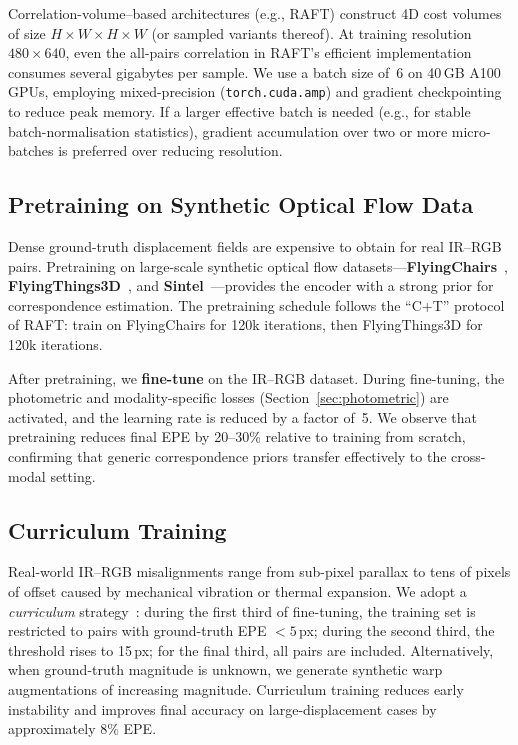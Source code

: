 Correlation-volume--based architectures (e.g., RAFT) construct 4D cost
volumes of size $H \times W \times H \times W$ (or sampled variants thereof).
At training resolution $480\times640$, even the all-pairs correlation in
RAFT's efficient implementation consumes several gigabytes per sample.  We
use a batch size of~6 on 40\,GB A100 GPUs, employing mixed-precision
(\texttt{torch.cuda.amp}) and gradient checkpointing to reduce peak memory.
If a larger effective batch is needed (e.g., for stable batch-normalisation
statistics), gradient accumulation over two or more micro-batches is
preferred over reducing resolution.

\subsection{Pretraining on Synthetic Optical Flow Data}
\label{ssec:pretrain}

Dense ground-truth displacement fields are expensive to obtain for real
IR--RGB pairs.  Pretraining on large-scale synthetic optical flow
datasets---\textbf{FlyingChairs}~\cite{dosovitskiy2015flownet},
\textbf{FlyingThings3D}~\cite{mayer2016things3d}, and
\textbf{Sintel}~\cite{butler2012sintel}---provides the encoder with a strong
prior for correspondence estimation.  The pretraining schedule
follows the ``C+T'' protocol of RAFT: train on FlyingChairs for 120k
iterations, then FlyingThings3D for 120k iterations.

After pretraining, we \textbf{fine-tune} on the IR--RGB dataset.  During
fine-tuning, the photometric and modality-specific losses
(Section~\ref{sec:photometric}) are activated, and the learning rate is
reduced by a factor of~5.  We observe that pretraining reduces final EPE by
20--30\% relative to training from scratch, confirming that generic
correspondence priors transfer effectively to the cross-modal setting.

\subsection{Curriculum Training}
\label{ssec:curriculum}

Real-world IR--RGB misalignments range from sub-pixel parallax to tens of
pixels of offset caused by mechanical vibration or thermal expansion.  We
adopt a \emph{curriculum} strategy~\cite{bengio2009curriculum}: during the
first third of fine-tuning, the training set is restricted to pairs with
ground-truth EPE $< 5$\,px; during the second third, the threshold rises to
15\,px; for the final third, all pairs are included.  Alternatively, when
ground-truth magnitude is unknown, we generate synthetic warp augmentations of
increasing magnitude.  Curriculum training reduces early instability and
improves final accuracy on large-displacement cases by approximately
8\% EPE.


